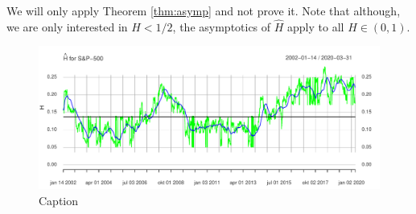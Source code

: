 We will only apply Theorem \ref{thm:asymp} and not prove it. Note that although, we are only interested in $H<1/2$, the asymptotics of $\hat{H}$ apply to all $H\in (0,1)$.
\begin{figure}[H]
    \centering
    \includegraphics[scale=0.65]{fig/img/RealizedLib/rolling_H.pdf}
    \caption{Caption}
    \label{fig:enter-label}
\end{figure}
